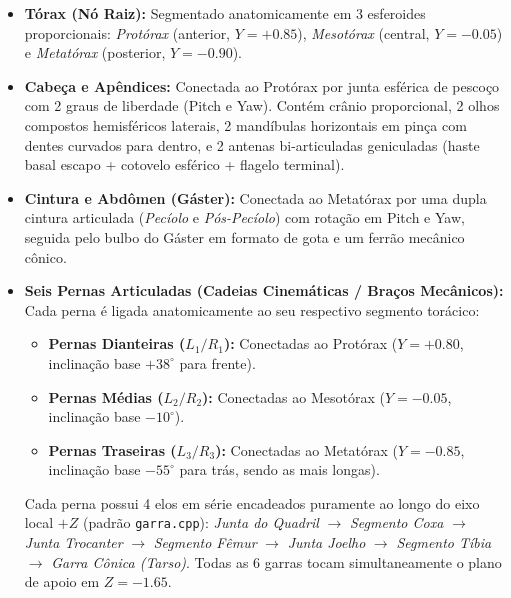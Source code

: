 \documentclass[11pt,a4paper]{article}
\begin{document}
\begin{itemize}[leftmargin=*]
    \item \textbf{Tórax (Nó Raiz):} Segmentado anatomicamente em 3 esferoides proporcionais: \textit{Protórax} (anterior, $Y = +0.85$), \textit{Mesotórax} (central, $Y = -0.05$) e \textit{Metatórax} (posterior, $Y = -0.90$).
    \item \textbf{Cabeça e Apêndices:} Conectada ao Protórax por junta esférica de pescoço com 2 graus de liberdade (Pitch e Yaw). Contém crânio proporcional, 2 olhos compostos hemisféricos laterais, 2 mandíbulas horizontais em pinça com dentes curvados para dentro, e 2 antenas bi-articuladas geniculadas (haste basal escapo + cotovelo esférico + flagelo terminal).
    \item \textbf{Cintura e Abdômen (Gáster):} Conectada ao Metatórax por uma dupla cintura articulada (\textit{Pecíolo} e \textit{Pós-Pecíolo}) com rotação em Pitch e Yaw, seguida pelo bulbo do Gáster em formato de gota e um ferrão mecânico cônico.
    \item \textbf{Seis Pernas Articuladas (Cadeias Cinemáticas / Braços Mecânicos):}
    Cada perna é ligada anatomicamente ao seu respectivo segmento torácico:
    \begin{itemize}[noitemsep]
        \item \textbf{Pernas Dianteiras ($L_1 / R_1$):} Conectadas ao Protórax ($Y = +0.80$, inclinação base $+38^\circ$ para frente).
        \item \textbf{Pernas Médias ($L_2 / R_2$):} Conectadas ao Mesotórax ($Y = -0.05$, inclinação base $-10^\circ$).
        \item \textbf{Pernas Traseiras ($L_3 / R_3$):} Conectadas ao Metatórax ($Y = -0.85$, inclinação base $-55^\circ$ para trás, sendo as mais longas).
    \end{itemize}
    Cada perna possui 4 elos em série encadeados puramente ao longo do eixo local $+Z$ (padrão \texttt{garra.cpp}):
    \textit{Junta do Quadril} $\to$ \textit{Segmento Coxa} $\to$ \textit{Junta Trocanter} $\to$ \textit{Segmento Fêmur} $\to$ \textit{Junta Joelho} $\to$ \textit{Segmento Tíbia} $\to$ \textit{Garra Cônica (Tarso)}. Todas as 6 garras tocam simultaneamente o plano de apoio em $Z = -1.65$.
\end{itemize}

\newpage

\end{document}
